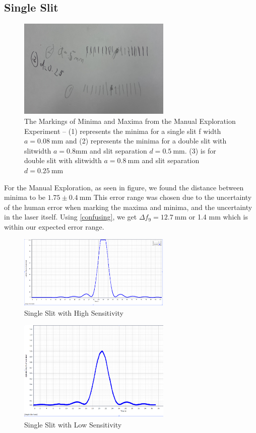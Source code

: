 \documentclass{article}[12pt]
\begin{document}
\subsection {Single Slit}
\begin{figure}
  \center
  \includegraphics[width=0.65\textwidth]{figures/peaks_drawing.jpg}
  \caption{The Markings of Minima and Maxima from the Manual Exploration Experiment -- (1) represents the minima for a single slit f width $ a = 0.08~\mathrm{mm} $ and (2) represents the minima for a double slit with slitwidth $ a=0.8\mathrm{mm} $ and slit separation $ d=0.5~\mathrm{mm} $. (3) is for double slit with slitwidth $ a=0.8~\mathrm{mm} $ and slit separation $ d=0.25~\mathrm{mm} $}
\end{figure}

For the Manual Exploration, as seen in figure, we found the distance between minima to be $ 1.75 \pm 0.4~\mathrm{mm} $ 
This error range was chosen due to the uncertainty of the human error when marking the maxima and minima, and the uncertainty in the laser itself.
Using \eqref{confusing}, we get $ \Delta f_9  = 12.7~\mathrm{mm}$ or 1.4 mm which is within our expected error range.

\begin{figure}
  \center
  \includegraphics[width=0.65\textwidth]{figures/single_hig.PNG}
  \caption{Single Slit with High Sensitivity}
\end{figure}

\begin{figure}
  \center
  \includegraphics[width=0.65\textwidth]{figures/single_low.PNG}
  \caption{Single Slit with Low Sensitivity}
\end{figure}
\end{document}
